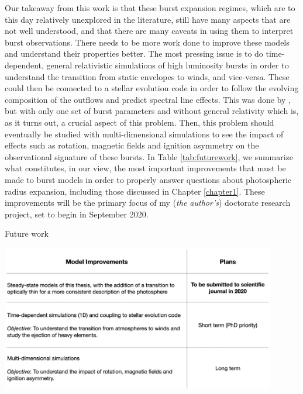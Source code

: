 \documentclass[../main.tex]{subfiles}
\begin{document}
Our takeaway from this work is that these burst expansion regimes, which are to this day relatively unexplored in the literature, still have many aspects that are not well understood, and that there are many caveats in using them to interpret burst observations. There needs to be more work done to improve these models and understand their properties better. The most pressing issue is to do time-dependent, general relativistic simulations of high luminosity bursts in order to understand the transition from static envelopes to winds, and vice-versa. These could then be connected to a stellar evolution code in order to follow the evolving composition of the outflows and predict spectral line effects. This was done by \citet{YuHangWeinberg2018}, but with only one set of burst parameters and without general relativity which is, as it turns out, a crucial aspect of this problem. Then, this problem should eventually be studied with multi-dimensional simulations to see the impact of effects such as rotation, magnetic fields and ignition asymmetry on the observational signature of these bursts. In Table \ref{tab:futurework}, we summarize what constitutes, in our view, the most important improvements that must be made to burst models in order to properly answer questions about photospheric radius expansion, including those discussed in Chapter \ref{chapter1}. These improvements will be the primary focus of my (\textit{the author's}) doctorate research project, set to begin in September 2020.

\begin{table}[h!]
    \centering
    \caption{Future work}
    \includegraphics[width=0.9\textwidth]{figures/table2.png}
    \label{tab:futurework}
\end{table}

\newpage
\end{document}
